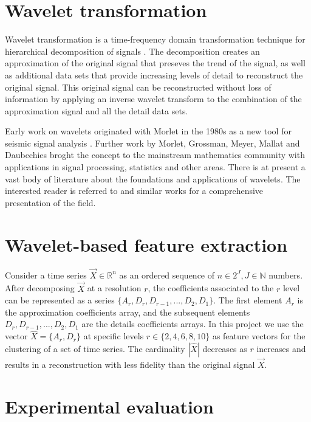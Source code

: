 \documentclass{article}
\begin{document}
\section{Wavelet transformation}

Wavelet transformation is a time-frequency domain transformation technique for hierarchical decomposition of signals \cite{C92,D92}. The decomposition creates an approximation of the original signal that preseves the trend of the signal, as well as additional data sets that provide increasing levels of detail to reconstruct the original signal. This original signal can be reconstructed without loss of information by applying an inverse wavelet transform to the combination of the approximation signal and all the detail data sets.

Early work on wavelets originated with Morlet in the 1980s as a new tool for seismic signal analysis \cite{MAFG82}. Further work by Morlet, Grossman, Meyer, Mallat and Daubechies \cite{CGT89,D88} broght the concept to the mainstream mathematics community with applications in signal processing, statistics and other areas. There is at present a vast body of literature about the foundations and applications of wavelets. The interested reader is referred to \cite{BGG98} and similar works for a comprehensive presentation of the field.


\section{Wavelet-based feature extraction}

Consider a time series $\overrightarrow{X} \in \mathbb{R}^n$ as an ordered sequence of $n \in 2^J, J \in \mathbb{N}$ numbers. After decomposing $\overrightarrow{X}$ at a resolution $r$, the coefficients associated to the $r$ level can be represented as a series $\{A_r,D_r,D_{r-1},...,D_2,D_1\}$. The first element $A_r$ is the approximation coefficients array, and the subsequent elements $D_r,D_{r-1},...,D_2,D_1$ are the details coefficients arrays. In this project we use the vector $\widehat{X} = \{A_r,D_r\}$ at specific levels $r \in \{2,4,6,8,10\}$ as feature vectors for the clustering of a set of time series. The cardinality $|\widehat{X}|$ decreases as $r$ increases and results in a reconstruction with less fidelity than the original signal $\overrightarrow{X}$.


\section{Experimental evaluation}
\end{document}
